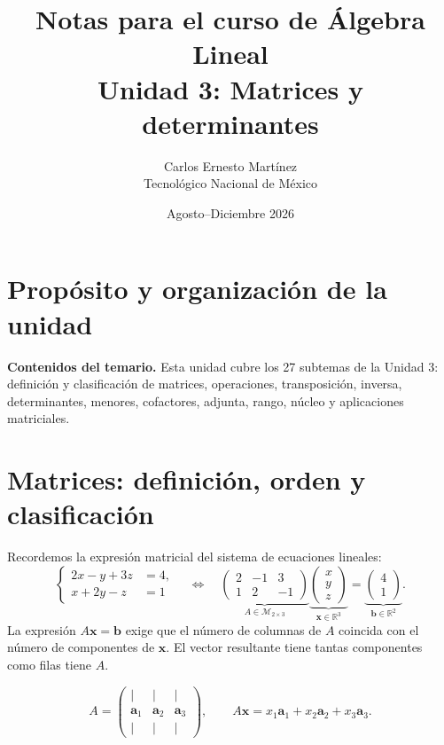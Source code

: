 \documentclass[12pt]{article}
\title{\textbf{Notas para el curso de Álgebra Lineal}\\[0.35cm]
\Large Unidad 3: Matrices y determinantes}
\author{Carlos Ernesto Martínez\\Tecnológico Nacional de México}
\date{Agosto--Diciembre 2026}
\theoremstyle{remark}
\newcommand{\R}{\mathbb{R}}
\newcommand{\Mat}[2]{\mathcal{M}_{#1\times #2}}
\newcommand{\vect}[1]{\boldsymbol{#1}}
\begin{document}
\maketitle
\tableofcontents
\newpage
\section*{Propósito y organización de la unidad}
\textbf{Contenidos del temario.} Esta unidad cubre los 27 subtemas de la Unidad 3: definición y clasificación de matrices, operaciones, transposición, inversa, determinantes, menores, cofactores, adjunta, rango, núcleo y aplicaciones matriciales.

\section{Matrices: definición, orden y clasificación}

Recordemos la expresión matricial del sistema de ecuaciones lineales:
\[
\left\{\begin{aligned}2x-y+3z&=4,\\x+2y-z&=1\end{aligned}\right.
\quad\Longleftrightarrow\quad
\underbrace{\begin{pmatrix}2&-1&3\\1&2&-1\end{pmatrix}}_{A\in\Mat{2}{3}}
\underbrace{\begin{pmatrix}x\\y\\z\end{pmatrix}}_{\vect x\in\R^3}
=\underbrace{\begin{pmatrix}4\\1\end{pmatrix}}_{\vect b\in\R^2}.
\]
La expresión $A\vect x=\vect b$ exige que el número de columnas de $A$ coincida con el número de componentes de $\vect x$. El vector resultante tiene tantas componentes como filas tiene $A$.

\[
A=\begin{pmatrix}|&|&|\\\vect a_1&\vect a_2&\vect a_3\\|&|&|\end{pmatrix},\qquad
A\vect x=x_1\vect a_1+x_2\vect a_2+x_3\vect a_3.
\]
\end{document}
